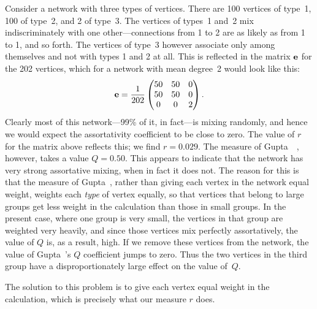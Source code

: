 \documentclass[twocolumn,pre]{revtex4}
\begin{document}
Consider a network with three types of vertices.  There are 100 vertices of
type~1, 100 of type~2, and 2 of type~3.  The vertices of types~1 and~2 mix
indiscriminately with one other---connections from 1 to 2 are as likely as
from 1 to 1, and so forth.  The vertices of type~3 however associate only
among themselves and not with types 1 and 2 at all.  This is reflected in
the matrix $\mathbf{e}$ for the 202 vertices, which for a network with mean
degree~2 would look like this:
\begin{equation}
\mathbf{e} = {1\over202}
      \begin{pmatrix}
        50 & 50 & 0 \\
        50 & 50 & 0 \\
         0 &  0 & 2 \\
      \end{pmatrix}.
\end{equation}
Clearly most of this network---99\% of it, in fact---is mixing randomly,
and hence we would expect the assortativity coefficient to be close to
zero.  The value of $r$ for the matrix above reflects this; we find
$r=0.029$.  The measure of Gupta~\etal~\cite{GAM89}, however, takes a value
$Q=0.50$.  This appears to indicate that the network has very strong
assortative mixing, when in fact it does not.  The reason for this is that
the measure of Gupta~\etal, rather than giving each vertex in the network
equal weight, weights each \emph{type} of vertex equally, so that vertices
that belong to large groups get less weight in the calculation than those
in small groups.  In the present case, where one group is very small, the
vertices in that group are weighted very heavily, and since those vertices
mix perfectly assortatively, the value of $Q$ is, as a result, high.  If we
remove these vertices from the network, the value of Gupta~\etal's $Q$
coefficient jumps to zero.  Thus the two vertices in the third group have a
disproportionately large effect on the value of~$Q$.

The solution to this problem is to give each vertex equal weight in the
calculation, which is precisely what our measure $r$ does.
\end{document}
